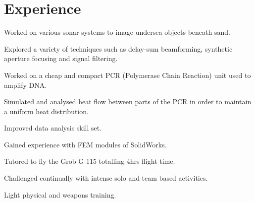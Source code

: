 \documentclass[]{cv_class}
\begin{document}
\begin{minipage}[t]{0.66\textwidth} 


\section{Experience}

\vspace{\topsep} %
\begin{tightemize}
\item Worked on various sonar systems to image undersea objects beneath sand.
\item Explored a variety of techniques such as delay-sum beamforming, synthetic aperture focusing and signal filtering.
\end{tightemize}
\sectionsep

\begin{tightemize}
\item Worked on a cheap and compact PCR (Polymerase Chain Reaction) unit used to amplify DNA. 
\item Simulated and analysed heat flow between parts of the PCR in order to maintain a uniform heat distribution. 
\item Improved data analysis skill set.
\item Gained experience with FEM modules of SolidWorks.
\end{tightemize}
\sectionsep

\begin{tightemize}
\item Tutored to fly the Grob G 115 totalling 4hrs flight time. 
\item Challenged continually with intense solo and team based activities. 
\item Light physical and weapons training.
\end{tightemize}
\sectionsep


\end{minipage}
\end{document}
